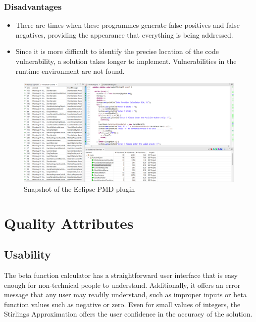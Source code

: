 \documentclass[a4paper, 12pt]{article}
\begin{document}
\subsubsection*{Disadvantages}
    \begin{itemize}[noitemsep]
        \item There are times when these programmes generate false positives and false negatives, providing the appearance that everything is being addressed.
        \item Since it is more difficult to identify the precise location of the code vulnerability, a solution takes longer to implement. Vulnerabilities in the runtime environment are not found.
    \end{itemize}

\begin{figure}[h]
    \centering
    \begin{center}
    \includegraphics[width=1.0\linewidth]{Images/PMD_plugin_violations.png}    
    \end{center}
    \caption{Snapshot of the Eclipse PMD plugin}
    \label{fig:Eclipse PMD Plugin}
\end{figure}

\newpage

\section*{Quality Attributes}
\subsection*{Usability}
The beta function calculator has a straightforward user interface that is easy enough for non-technical people to understand. Additionally, it offers an error message that any user may readily understand, such as improper inputs or beta function values such as negative or zero. Even for small values of integers, the Stirlings Approximation offers the user confidence in the accuracy of the solution.
\end{document}

